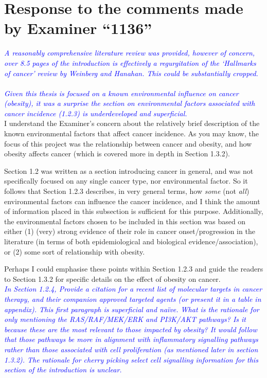 \documentclass[a4paper, 12pt]{article}
\begin{document}
\section*{Response to the comments made by Examiner ``1136''}
\label{sec:response_to_comments_from_examiner_1136}

\noindent
\textcolor{blue}{
	\textit{A reasonably comprehensive literature review was provided, however of concern, over 8.5 pages of the introduction is effectively a regurgitation of the `Hallmarks of cancer' review by Weinberg and Hanahan.
	This could be substantially cropped.
	}
}\\

\noindent
\\

\noindent
\textcolor{blue}{
	\textit{Given this thesis is focused on a known environmental influence on cancer (obesity), it was a surprise the section on environmental factors associated with cancer incidence (1.2.3) is underdeveloped and superficial.
	}
}\\

\noindent
I understand the Examiner's concern about the relatively brief description of the known environmental factors that affect cancer incidence.
As you may know, the focus of this project was the relationship between cancer and obesity, and how obesity affects cancer (which is covered more in depth in Section 1.3.2).

Section 1.2 was written as a section introducing cancer in general, and was not specifically focused on any single cancer type, nor environmental factor.
So it follows that Section 1.2.3 describes, in very general terms, how \textit{some} (not \textit{all}) environmental factors can influence the cancer incidence, and I think the amount of information placed in this subsection is sufficient for this purpose.
Additionally, the environmental factors chosen to be included in this section was based on either (1) (very) strong evidence of their role in cancer onset/progression in the literature (in terms of both epidemiological and biological evidence/association), or (2) some sort of relationship with obesity.

Perhaps I could emphasise these points within Section 1.2.3 and guide the readers to Section 1.3.2 for specific details on the effect of obesity on cancer.
\\

\noindent
\textcolor{blue}{
	\textit{In Section 1.2.4, Provide a citation for a recent list of molecular targets in cancer therapy, and their companion approved targeted agents (or present it in a table in appendix).
	This first paragraph is superficial and na\"ive.
	What is the rationale for only mentioning the RAS/RAF/MEK/ERK and PI3K/AKT pathways?
	Is it because these are the most relevant to those impacted by obesity?
	It would follow that those pathways be more in alignment with inflammatory signalling pathways rather than those associated with cell proliferation (as mentioned later in section 1.3.2).
	The rationale for cherry picking select cell signalling information for this section of the introduction is unclear.
	}
}\\
\end{document}

